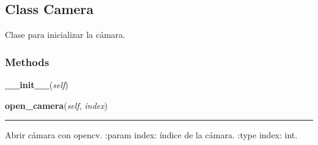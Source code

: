 \subsection{Class Camera}

    \label{src:camera:Camera}

Clase para inicializar la cámara.


  \subsubsection{Methods}

    \label{src:camera:Camera:__init__}

    \vspace{0.5ex}

\hspace{.8\funcindent}\begin{boxedminipage}{\funcwidth}

    \raggedright \textbf{\_\_init\_\_}(\textit{self})

\setlength{\parskip}{2ex}
\setlength{\parskip}{1ex}
    \end{boxedminipage}

    \label{src:camera:Camera:open_camera}

    \vspace{0.5ex}

\hspace{.8\funcindent}\begin{boxedminipage}{\funcwidth}

    \raggedright \textbf{open\_camera}(\textit{self}, \textit{index})

    \vspace{-1.5ex}

    \rule{\textwidth}{0.5\fboxrule}
\setlength{\parskip}{2ex}

Abrir cámara con opencv.
:param index: índice de la cámara.
:type index: int.
\setlength{\parskip}{1ex}
    \end{boxedminipage}

